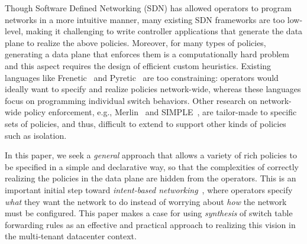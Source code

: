 Though Software Defined Networking (SDN) has allowed operators
to program networks in a more intuitive manner, many existing SDN
frameworks are too low-level, making it challenging
to write controller applications that generate the
data plane to realize the above policies. %
Moreover, for many types of
  policies, generating a data plane 
  that enforces them is a
computationally hard problem and
this aspect requires the design of efficient custom heuristics.
Existing
languages like Frenetic~\cite{frenetic} and Pyretic~\cite{pyretic} are
too constraining: operators would ideally want to specify
and realize policies network-wide, whereas these languages focus on
programming individual switch behaviors. %
Other research on network-wide policy enforcement, e.g.,
Merlin~\cite{merlin} and SIMPLE~\cite{simple}, are tailor-made to
specific sets of policies, and thus, difficult to extend to support
other kinds of policies such as isolation.


In this paper, we seek a {\em general} approach that allows a variety
of rich policies to be specified in a simple and declarative way, so
that the complexities of correctly realizing the policies in the data
plane are hidden from the operators. This is an important
initial step toward {\em intent-based networking}~\cite{intent}, where
operators specify {\em what} they want the network to do instead of
worrying about {\em how} the network must be configured.
This paper makes a case for using \emph{synthesis} of switch table
forwarding rules as an effective and practical approach to realizing
this vision in the multi-tenant datacenter context.

